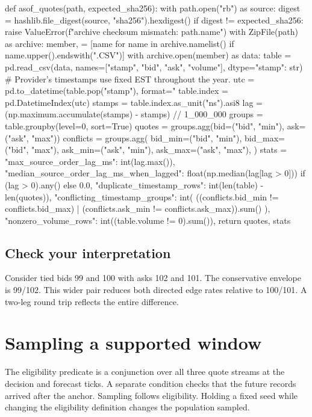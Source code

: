 \documentclass[11pt,oneside,openany]{book}
\begin{document}
\begin{BookCode}
def asof_quotes(path, expected_sha256):
    with path.open("rb") as source:
        digest = hashlib.file_digest(source, "sha256").hexdigest()
    if digest != expected_sha256:
        raise ValueError(f"archive checksum mismatch: {path.name}")
    with ZipFile(path) as archive:
        member, = [name for name in archive.namelist() if name.upper().endswith(".CSV")]
        with archive.open(member) as data:
            table = pd.read_csv(data, names=["stamp", "bid", "ask", "volume"], dtype={"stamp": str})
    # Provider's timestamps use fixed EST throughout the year.
    utc = pd.to_datetime(table.pop("stamp"), format="%
    table.index = pd.DatetimeIndex(utc)
    stamps = table.index.as_unit("ns").asi8
    lag = (np.maximum.accumulate(stamps) - stamps) // 1_000_000
    groups = table.groupby(level=0, sort=True)
    quotes = groups.agg(bid=("bid", "min"), ask=("ask", "max"))
    conflicts = groups.agg(
        bid_min=("bid", "min"), bid_max=("bid", "max"), ask_min=("ask", "min"), ask_max=("ask", "max"),
    )
    stats = {
        "max_source_order_lag_ms": int(lag.max()),
        "median_source_order_lag_ms_when_lagged": float(np.median(lag[lag > 0])) if (lag > 0).any() else 0.0,
        "duplicate_timestamp_rows": int(len(table) - len(quotes)),
        "conflicting_timestamp_groups": int(
            ((conflicts.bid_min != conflicts.bid_max) | (conflicts.ask_min != conflicts.ask_max)).sum()
        ),
        "nonzero_volume_rows": int((table.volume != 0).sum()),
    }
    return quotes, stats
\end{BookCode}
\section*{Check your interpretation}
Consider tied bids 99 and 100 with asks 102 and 101. The conservative envelope is 99/102. This wider pair reduces both directed edge rates relative to 100/101. A two-leg round trip reflects the entire difference.

\chapter{Sampling a supported window}
The eligibility predicate is a conjunction over all three quote streams at the decision and forecast ticks. A separate condition checks that the future records arrived after the anchor. Sampling follows eligibility. Holding a fixed seed while changing the eligibility definition changes the population sampled.
\end{document}
